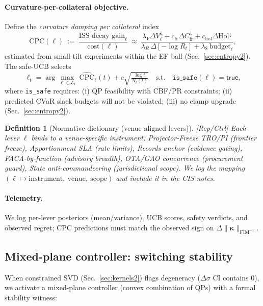 \documentclass[10pt]{article}
\newcommand{\FIM}{\mathrm{FIM}}
\newcommand{\layertag}[1]{\textup{[#1]}}
\newtheorem{definition}{Definition}
\begin{document}
\paragraph{Curvature-per-collateral objective.}
Define the \emph{curvature damping per collateral} index
\[
\mathrm{CPC}(\ell)\ :=\ \frac{\text{ISS decay gain}_\ell}{\mathrm{cost}(\ell)}
\ \approx\
\frac{\lambda_V \Delta V^{\downarrow}_\ell + c_{\mathrm{fr}}\Delta C_{\mathrm{fr}}^{\downarrow} + c_{\mathrm{hol}}\Delta \mathrm{Hol}^{\downarrow}}{\lambda_R\,\Delta[-\log R_t] + \lambda_{\$}\,\text{budget}_\ell},
\]
estimated from small-tilt experiments within the EF ball (Sec.~\ref{sec:entropy2}). The safe-UCB selects
\[
\ell_t = \arg\max_{\ell\in\mathcal L_t}\ \widehat{\mathrm{CPC}}_\ell(t)
+ c\sqrt{\tfrac{\log t}{N_\ell(t)}}
\quad\text{s.t.}\quad
\texttt{is\_safe}(\ell)=\textsf{true},
\]
where \texttt{is\_safe} requires: (i) QP feasibility with CBF/PR constraints; (ii) predicted CVaR slack budgets will not be violated; (iii) no clamp upgrade (Sec.~\ref{sec:entropy2}).

\begin{definition}[Normative dictionary (venue-aligned levers)]\label{def:normative}
\emph{\layertag{Rep/Ctrl}}
Each lever $\ell$ binds to a venue-specific instrument: \emph{Projector-Freeze TRO/PI} (frontier freeze), \emph{Apportionment SLA} (rate limits), \emph{Records anchor} (evidence gating), \emph{FACA-by-function} (advisory breadth), \emph{OTA/GAO concurrence} (procurement guard), \emph{State anti-commandeering} (jurisdictional scope). We log the mapping $(\ell\!\mapsto\!\text{instrument},\ \text{venue},\ \text{scope})$ and include it in the CIS notes.
\end{definition}

\paragraph{Telemetry.}
We log per-lever posteriors (mean/variance), UCB scores, safety verdicts, and observed regret; CPC predictions must match the observed sign on $\Delta\|\bm\kappa\|_{\FIM^{-1}}$.

\subsection*{Mixed-plane controller: switching stability}
When constrained SVD (Sec.~\ref{sec:kernels2}) flags degeneracy ($\Delta\sigma$ CI contains $0$), we activate a mixed-plane controller (convex combination of QPs) with a formal stability witness:
\end{document}
